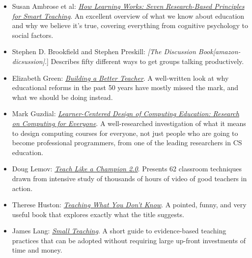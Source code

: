 
\begin{itemize}

\item
  Susan Ambrose et al:
\emph{\href{http://www.amazon.com/How-Learning-Works-Research-Based-Jossey-Bass/dp/0470484101/}{How
Learning Works: Seven Research-Based Principles for Smart Teaching}}.
An excellent overview of what we know about education and why we believe
it's true, covering everything from cognitive psychology to social
factors.

\item
  Stephen D. Brookfield and Stephen Preskill: \emph{{[}The
Discussion Book{}{[}amazon-dicsussion{]}}.]
Describes fifty different ways to get groups talking productively.

\item
  Elizabeth Green:
\emph{\href{http://www.amazon.com/Building-Better-Teacher-Teaching-Everyone/dp/0393081591}{Building
a Better Teacher}}.
A well-written look at why educational reforms in the past 50 years have
mostly missed the mark, and what we should be doing instead.

\item
  Mark Guzdial:
\emph{\href{http://www.amazon.com/Learner-Centered-Design-Computing-Education-Human-Centered/dp/1627053514/}{Learner-Centered
Design of Computing Education: Research on Computing for Everyone}}.
A well-researched investigation of what it means to design computing
courses for everyone, not just people who are going to become
professional programmers, from one of the leading researchers in CS
education.

\item
  Doug Lemov:
\emph{\href{http://www.amazon.com/Teach-Like-Champion-2-0-Techniques/dp/1118901851/}{Teach
Like a Champion 2.0}}.
Presents 62 classroom techniques drawn from intensive study of thousands
of hours of video of good teachers in action.

\item
  Therese Huston:
\emph{\href{http://www.amazon.com/Teaching-What-You-Dont-Know/dp/0674066170/}{Teaching
What You Don't Know}}.
A pointed, funny, and very useful book that explores exactly what the
title suggests.

\item
  James Lang:
\emph{\href{https://www.amazon.com/Small-Teaching-Everyday-Lessons-Learning/dp/1118944496/}{Small
Teaching}}.
A short guide to evidence-based teaching practices that can be adopted
without requiring large up-front investments of time and money.


\end{itemize}
